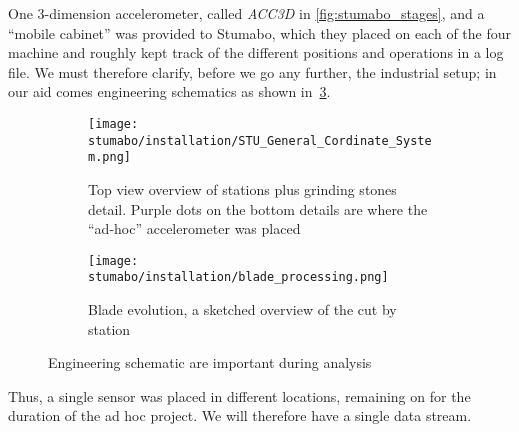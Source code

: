 One 3-dimension accelerometer, called \textit{ACC3D} in \ref{fig:stumabo_stages}, and a ``mobile cabinet'' was provided to Stumabo, which they placed on each of the four machine and roughly kept track of the different positions and operations in a log file.
We must therefore clarify, before we go any further, the industrial setup; in our aid comes engineering schematics as shown in~\ref{fig:top_view and blade}.
\begin{figure}[ht]
    \begin{subfigure}{\textwidth}
        \texttt{[image: stumabo/installation/STU\_General\_Cordinate\_System.png]}
        \caption{Top view overview of stations plus grinding stones detail.
            Purple dots on the bottom details are where the ``ad-hoc'' accelerometer was placed}
        \label{fig:top_view_line}
    \end{subfigure}
    \begin{subfigure}{\textwidth}
        \texttt{[image: stumabo/installation/blade\_processing.png]}
        \caption{Blade evolution, a sketched overview of the cut by station}
        \label{fig:blade_evolution}
    \end{subfigure}
    \caption{Engineering schematic are important during analysis}
    \label{fig:top_view and blade}
\end{figure}

Thus, a single sensor was placed in different locations, remaining on for the duration of the ad hoc project. We will therefore have a single data stream.





